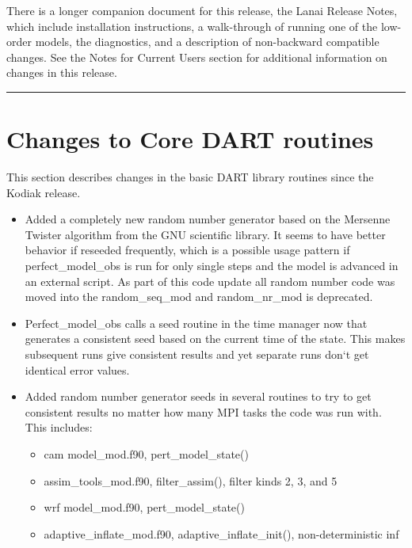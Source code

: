 \documentclass[letterpaper,10pt,english]{sphinxmanual}
\begin{document}
There is a longer companion document for this release, the Lanai
Release Notes, which include installation instructions, a walk-through of running one
of the low-order models, the diagnostics, and a description of
non-backward compatible changes. See the Notes for Current
Users section for additional information on changes in this release.


\bigskip\hrule{}\bigskip



\section{Changes to Core DART routines}
\label{docs/Lanai_diffs_from_Kodiak:changes-to-core-dart-routines}
This section describes changes in the basic DART library routines since
the Kodiak release.
\begin{itemize}
\item {} 
Added a completely new random number generator based on the Mersenne
Twister algorithm from the GNU scientific library. It seems to have
better behavior if reseeded frequently, which is a possible usage
pattern if perfect\_model\_obs is run for only single steps and the
model is advanced in an external script. As part of this code update
all random number code was moved into the random\_seq\_mod and
random\_nr\_mod is deprecated.

\item {} 
Perfect\_model\_obs calls a seed routine in the time manager now
that generates a consistent seed based on the current time of the
state. This makes subsequent runs give consistent results and yet
separate runs don`t get identical error values.

\item {} 
Added random number generator seeds in several routines to try to
get consistent results no matter how many MPI tasks the code was run
with. This includes:
\begin{itemize}
\item {} 
cam model\_mod.f90, pert\_model\_state()

\item {} 
assim\_tools\_mod.f90, filter\_assim(), filter kinds 2, 3, and 5

\item {} 
wrf model\_mod.f90, pert\_model\_state()

\item {} 
adaptive\_inflate\_mod.f90, adaptive\_inflate\_init(),
non-deterministic inf


\end{itemize}
\end{itemize}
\end{document}
